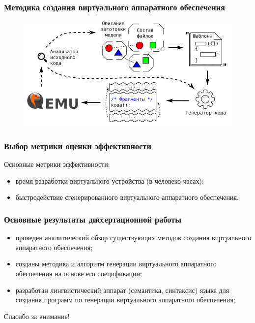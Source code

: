 \begin{frame}%
    \frametitle{Методика создания виртуального аппаратного обеспечения}
    \begin{figure}[!htbp]
        \centering
        \begin{adjustbox}{max totalsize={\textwidth}{\textheight}}
            \includegraphics[]{images/imposter_algorithm.png}
        \end{adjustbox}
    \end{figure}
\end{frame}


\begin{frame}%
    \frametitle{Выбор метрики оценки эффективности}
    Основные метрики эффективности:
    \begin{itemize}
        \item время разработки виртуального устройства (в человеко-часах);
        \item быстродействие сгенерированного виртуального аппаратного обеспечения.
    \end{itemize}
\end{frame}


\begin{frame}%
    \frametitle{Основные результаты диссертационной работы}
    \begin{itemize}
        \item проведен аналитический обзор существующих методов создания виртуального аппаратного обеспечения;
        \item созданы методика и алгоритм генерации виртуального аппаратного обеспечения на основе его спецификации;
        \item разработан лингвистический аппарат (семантика, синтаксис) языка для создания программ по генерации виртуального
            аппаратного обеспечения;
    \end{itemize}
\end{frame}


\begin{frame}%
    \begin{center}
        \Huge Спасибо за внимание!
    \end{center}
\end{frame}
